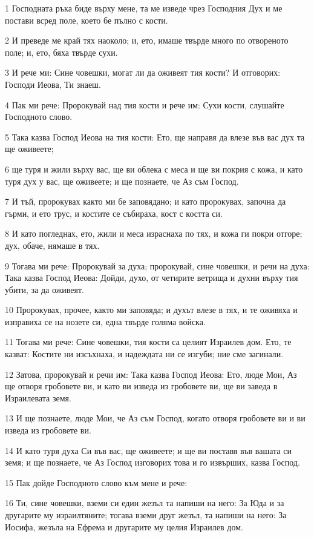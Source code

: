 \par 1 Господната ръка биде върху мене, та ме изведе чрез Господния Дух и ме постави всред поле, което бе пълно с кости.
\par 2 И преведе ме край тях наоколо; и, ето, имаше твърде много по отвореното поле; и, ето, бяха твърде сухи.
\par 3 И рече ми: Сине човешки, могат ли да оживеят тия кости? И отговорих: Господи Иеова, Ти знаеш.
\par 4 Пак ми рече: Пророкувай над тия кости и рече им: Сухи кости, слушайте Господното слово.
\par 5 Така казва Господ Иеова на тия кости: Ето, ще направя да влезе във вас дух та ще оживеете;
\par 6 ще туря и жили върху вас, ще ви облека с меса и ще ви покрия с кожа, и като туря дух у вас, ще оживеете; и ще познаете, че Аз съм Господ.
\par 7 И тъй, пророкувах както ми бе заповядано; и като пророкувах, започна да гърми, и ето трус, и костите се събираха, кост с костта си.
\par 8 И като погледнах, ето, жили и меса израснаха по тях, и кожа ги покри отгоре; дух, обаче, нямаше в тях.
\par 9 Тогава ми рече: Пророкувай за духа; пророкувай, сине човешки, и речи на духа: Така казва Господ Иеова: Дойди, духо, от четирите ветрища и духни върху тия убити, за да оживеят.
\par 10 Пророкувах, прочее, както ми заповяда; и духът влезе в тях, и те оживяха и изправиха се на нозете си, една твърде голяма войска.
\par 11 Тогава ми рече: Сине човешки, тия кости са целият Израилев дом. Ето, те казват: Костите ни изсъхнаха, и надеждата ни се изгуби; ние сме загинали.
\par 12 Затова, пророкувай и речи им: Така казва Господ Иеова: Ето, люде Мои, Аз ще отворя гробовете ви, и като ви изведа из гробовете ви, ще ви заведа в Израилевата земя.
\par 13 И ще познаете, люде Мои, че Аз съм Господ, когато отворя гробовете ви и ви изведа из гробовете ви.
\par 14 И като туря духа Си във вас, ще оживеете; и ще ви поставя във вашата си земя; и ще познаете, че Аз Господ изговорих това и го извърших, казва Господ.
\par 15 Пак дойде Господното слово към мене и рече:
\par 16 Ти, сине човешки, вземи си един жезъл та напиши на него: За Юда и за другарите му израилтяните; тогава вземи друг жезъл, та напиши на него: За Иосифа, жезъла на Ефрема и другарите му целия Израилев дом.

